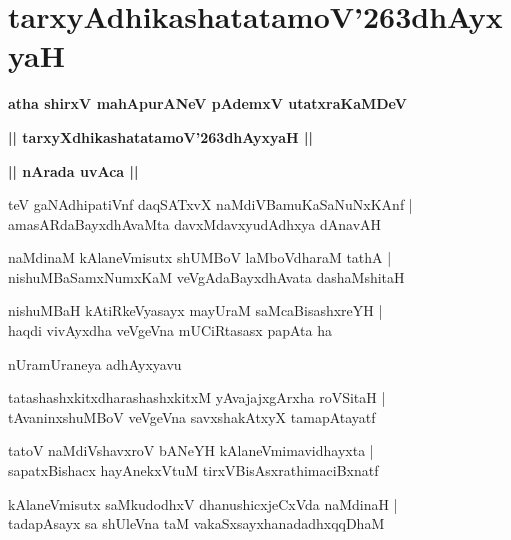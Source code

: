 \documentclass[twoside,12pt,openright]{book}
\def\S{\char'263}
\newcounter{shloka}[chapter]
\def\uvaca#1{\centerline{{\large\textbf{#1}}}}
\begin{document}
\chapter{tarxyAdhikashatatamoV\S dhAyxyaH}

\begin{center}
{\LARGE\bfseries atha shirxV mahApurANeV pAdemxV utatxraKaMDeV}
\end{center}

\begin{center}
{\LARGE\bfseries || tarxyXdhikashatatamoV\S dhAyxyaH || }
\end{center}

\uvaca{|| nArada uvAca ||}

\begin{shloka}%
teV gaNAdhipatiVnf daqSATxvX naMdiVBamuKaSaNuNxKAnf |\\
amasARdaBayxdhAvaMta davxMdavxyudAdhxya dAnavAH 
\end{shloka}

\begin{shloka}%
naMdinaM kAlaneVmisutx shUMBoV laMboVdharaM tathA |\\
nishuMBaSamxNumxKaM veVgAdaBayxdhAvata dashaMshitaH
\end{shloka}

\begin{shloka}%
nishuMBaH kAtiRkeVyasayx mayUraM saMcaBisashxreYH |\\
haqdi vivAyxdha veVgeVna mUCiRtasasx papAta ha 
\end{shloka}

\begin{center}
nUramUraneya adhAyxyavu
\end{center}

\begin{shloka}%
tatashashxkitxdharashashxkitxM yAvajajxgArxha roVSitaH |\\
tAvaninxshuMBoV veVgeVna savxshakAtxyX tamapAtayatf 
\end{shloka}

\begin{shloka}%
tatoV naMdiVshavxroV bANeYH kAlaneVmimavidhayxta |\\
sapatxBishacx hayAnekxVtuM tirxVBisAsxrathimaciBxnatf
\end{shloka}

\begin{shloka}%
kAlaneVmisutx saMkudodhxV dhanushicxjeCxVda naMdinaH |\\
tadapAsayx sa shUleVna taM vakaSxsayxhanadadhxqqDhaM 
\end{shloka}
\end{document}
